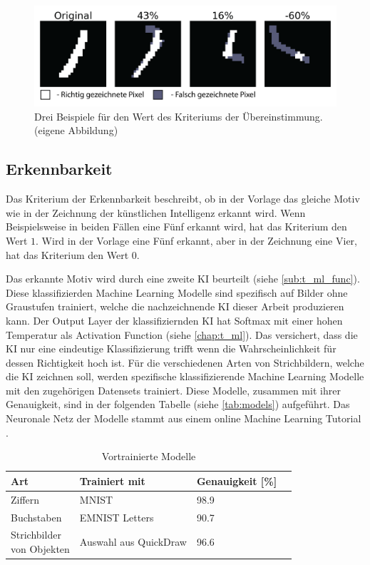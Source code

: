\begin{figure}[!ht]
 \centering
 \includegraphics[width=\textwidth]{images/methode/ubereinstimm.png}
 \caption{Drei Beispiele für den Wert des Kriteriums der Übereinstimmung. (eigene Abbildung)}\label{fig:ubereinstimmung}
\end{figure}

\newpage

\subsection{Erkennbarkeit}\label{sub:m_eval_rec}
Das Kriterium der Erkennbarkeit beschreibt, ob in der Vorlage das gleiche Motiv
wie in der Zeichnung der künstlichen Intelligenz erkannt wird. Wenn
Beispielsweise in beiden Fällen eine Fünf erkannt wird, hat das Kriterium den
Wert $1$. Wird in der Vorlage eine Fünf erkannt, aber in der Zeichnung eine
Vier, hat das Kriterium den Wert $0$.
 
Das erkannte Motiv wird durch eine zweite KI beurteilt (siehe
\ref{sub:t_ml_func}). Diese klassifizierden Machine Learning Modelle sind
spezifisch auf Bilder ohne Graustufen trainiert, welche die nachzeichnende KI
dieser Arbeit produzieren kann. Der Output Layer der klassifiziernden KI hat
Softmax mit einer hohen Temperatur als Activation Function (siehe
\ref{chap:t_ml}). Das versichert, dass die KI nur eine eindeutige
Klassifizierung trifft wenn die Wahrscheinlichkeit für dessen Richtigkeit hoch
ist. Für die verschiedenen Arten von Strichbildern, welche die KI zeichnen soll,
werden spezifische klassifizierende Machine Learning Modelle mit den zugehörigen
Datensets trainiert. Diese Modelle, zusammen mit ihrer Genauigkeit, sind in der
folgenden Tabelle (siehe \autoref{tab:models}) aufgeführt. Das Neuronale Netz
der Modelle stammt aus einem online Machine Learning Tutorial \cite{dataflair_handwritten_2020}.

\begin{table}[!ht]
 \centering  
 \begin{tabular}{|l|l|l|l|}
 \hline
     Art & Trainiert mit & Genauigkeit [\%]\\ \hline
     Ziffern & MNIST & 98.9\\ \hline
     Buchstaben  & EMNIST Letters & 90.7\\ \hline
     \makecell{Strichbilder\\von Objekten}  & Auswahl aus QuickDraw & 96.6\\ \hline
 \end{tabular}
 \caption{Vortrainierte Modelle}\label{tab:models}
\end{table}
 
